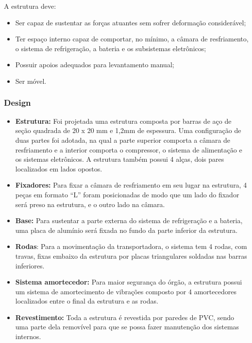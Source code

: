 A estrutura deve:

\begin{itemize}
	\item Ser capaz de sustentar as forças atuantes sem sofrer deformação considerável;
	\item Ter espaço interno capaz de comportar, no mínimo, a câmara de resfriamento, o sistema de refrigeração, a bateria e os subsistemas eletrônicos;
	\item Possuir apoios adequados para levantamento manual;
	\item Ser móvel.
\end{itemize}

\subsubsection{Design}

\begin{itemize}
	\item \textbf{Estrutura:} Foi projetada uma estrutura composta por barras de aço de seção quadrada de 20 x 20 mm e 1,2mm de espessura. Uma configuração de duas partes foi adotada, na qual a parte superior comporta a câmara de resfriamento e a interior comporta o compressor,  o sistema de alimentação e os sistemas eletrônicos. A estrutura também possui 4 alças, dois pares localizados em lados opostos.
	\item \textbf{Fixadores:} Para fixar a câmara de resfriamento em seu lugar na estrutura, 4 peças em formato “L” foram posicionadas de modo que um lado do fixador será preso na estrutura, e o outro lado na câmara.
	\item \textbf{Base:} Para sustentar a parte externa do sistema de refrigeração e a bateria, uma placa de alumínio será fixada no fundo da parte inferior da estrutura.
	\item \textbf{Rodas}: Para a movimentação da transportadora, o sistema tem 4 rodas, com travas, fixas embaixo da estrutura por placas triangulares soldadas nas barras inferiores.
	\item \textbf{Sistema amortecedor:} Para maior segurança do órgão, a estrutura possui um sistema de amortecimento de vibrações composto por 4 amortecedores localizados entre o final da estrutura e as rodas.
	\item \textbf{Revestimento:} Toda a estrutura é revestida por paredes de PVC, sendo uma parte dela removível para que se possa fazer manutenção dos sistemas internos.
\end{itemize}


